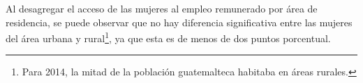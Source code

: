 Al desagregar el acceso de las mujeres al empleo remunerado por área de residencia, se puede observar que no hay diferencia significativa entre las mujeres del área urbana y rural\footnote{Para 2014, la mitad de la población guatemalteca habitaba en áreas rurales.}, ya que esta es de menos de dos puntos porcentual. 


